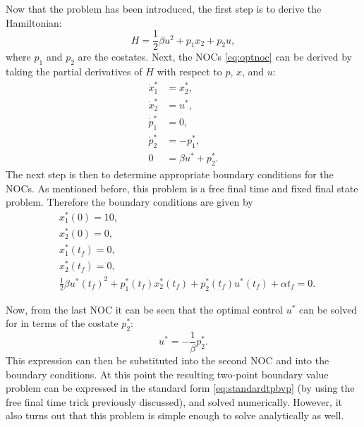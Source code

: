 \begin{example}
Now that the problem has been introduced, the first step is to derive the Hamiltonian:
\begin{equation*}
H = \frac{1}{2}\beta u^2 + p_1x_2 + p_2u,
\end{equation*}
where $p_1$ and $p_2$ are the costates. Next, the NOCs \eqref{eq:optnoc} can be derived by taking the partial derivatives of $H$ with respect to $p$, $x$, and $u$:
\begin{equation*}
\begin{split}
\dot{x}_1^* &= x_2^*, \\
\dot{x}_2^* &= u^*, \\
\dot{p}_1^* &= 0, \\
\dot{p}_2^* &=-p_1^*, \\
0 & = \beta u^* + p_2^*.
\end{split}
\end{equation*}
The next step is then to determine appropriate boundary conditions for the NOCs. As mentioned before, this problem is a free final time and fixed final state problem. Therefore the boundary conditions are given by
\begin{equation*}
\begin{split}
&x_1^*(0) = 10, \\
&x_2^*(0) = 0, \\
&x_1^*(t_f) = 0, \\
&x_2^*(t_f) = 0, \\
&\frac{1}{2}\beta u^*(t_f)^2 + p_1^*(t_f)x_2^*(t_f)+p_2^*(t_f)u^*(t_f) + \alpha t_f = 0.
\end{split}
\end{equation*}

Now, from the last NOC it can be seen that the optimal control $u^*$ can be solved for in terms of the costate $p_2^*$:
\begin{equation*}
    u^* = -\frac{1}{\beta}p_2^*.
\end{equation*}
This expression can then be substituted into the second NOC and into the boundary conditions. At this point the resulting two-point boundary value problem can be expressed in the standard form \eqref{eq:standardtpbvp} (by using the free final time trick previously discussed), and solved numerically. However, it also turns out that this problem is simple enough to solve analytically as well.


\end{example}
